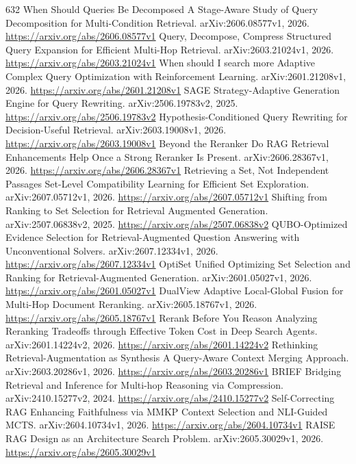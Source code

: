 \documentclass[11pt]{article}
\begin{document}
\begin{thebibliography}{632}
 When Should Queries Be Decomposed A Stage-Aware Study of Query Decomposition for Multi-Condition Retrieval. arXiv:2606.08577v1, 2026. \url{https://arxiv.org/abs/2606.08577v1}
 Query, Decompose, Compress Structured Query Expansion for Efficient Multi-Hop Retrieval. arXiv:2603.21024v1, 2026. \url{https://arxiv.org/abs/2603.21024v1}
 When should I search more Adaptive Complex Query Optimization with Reinforcement Learning. arXiv:2601.21208v1, 2026. \url{https://arxiv.org/abs/2601.21208v1}
 SAGE Strategy-Adaptive Generation Engine for Query Rewriting. arXiv:2506.19783v2, 2025. \url{https://arxiv.org/abs/2506.19783v2}
 Hypothesis-Conditioned Query Rewriting for Decision-Useful Retrieval. arXiv:2603.19008v1, 2026. \url{https://arxiv.org/abs/2603.19008v1}
 Beyond the Reranker Do RAG Retrieval Enhancements Help Once a Strong Reranker Is Present. arXiv:2606.28367v1, 2026. \url{https://arxiv.org/abs/2606.28367v1}
 Retrieving a Set, Not Independent Passages Set-Level Compatibility Learning for Efficient Set Exploration. arXiv:2607.05712v1, 2026. \url{https://arxiv.org/abs/2607.05712v1}
 Shifting from Ranking to Set Selection for Retrieval Augmented Generation. arXiv:2507.06838v2, 2025. \url{https://arxiv.org/abs/2507.06838v2}
 QUBO-Optimized Evidence Selection for Retrieval-Augmented Question Answering with Unconventional Solvers. arXiv:2607.12334v1, 2026. \url{https://arxiv.org/abs/2607.12334v1}
 OptiSet Unified Optimizing Set Selection and Ranking for Retrieval-Augmented Generation. arXiv:2601.05027v1, 2026. \url{https://arxiv.org/abs/2601.05027v1}
 DualView Adaptive Local-Global Fusion for Multi-Hop Document Reranking. arXiv:2605.18767v1, 2026. \url{https://arxiv.org/abs/2605.18767v1}
 Rerank Before You Reason Analyzing Reranking Tradeoffs through Effective Token Cost in Deep Search Agents. arXiv:2601.14224v2, 2026. \url{https://arxiv.org/abs/2601.14224v2}
 Rethinking Retrieval-Augmentation as Synthesis A Query-Aware Context Merging Approach. arXiv:2603.20286v1, 2026. \url{https://arxiv.org/abs/2603.20286v1}
 BRIEF Bridging Retrieval and Inference for Multi-hop Reasoning via Compression. arXiv:2410.15277v2, 2024. \url{https://arxiv.org/abs/2410.15277v2}
 Self-Correcting RAG Enhancing Faithfulness via MMKP Context Selection and NLI-Guided MCTS. arXiv:2604.10734v1, 2026. \url{https://arxiv.org/abs/2604.10734v1}
 RAISE RAG Design as an Architecture Search Problem. arXiv:2605.30029v1, 2026. \url{https://arxiv.org/abs/2605.30029v1}

\end{thebibliography}
\end{document}
